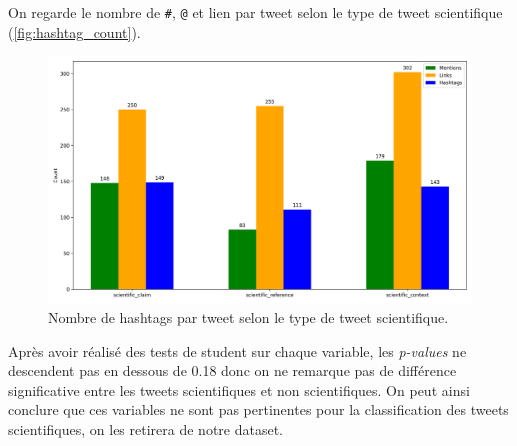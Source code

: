 On regarde le nombre de \texttt{\#}, \texttt{@} et lien par tweet selon le type de tweet scientifique (\autoref{fig:hashtag_count}).

\begin{figure}[H]
    \centering
    \includegraphics[width=1\textwidth]{images/hashtag_links_mentions_count_outliers}
    \caption{Nombre de hashtags par tweet selon le type de tweet scientifique.}
    \label{fig:hashtag_count}
\end{figure}

Après avoir réalisé des tests de student sur chaque variable, les \textit{p-values} ne descendent pas en dessous de 0.18 donc on ne remarque pas de différence significative entre les tweets scientifiques et non scientifiques.
On peut ainsi conclure que ces variables ne sont pas pertinentes pour la classification des tweets scientifiques, on les retirera de notre dataset.